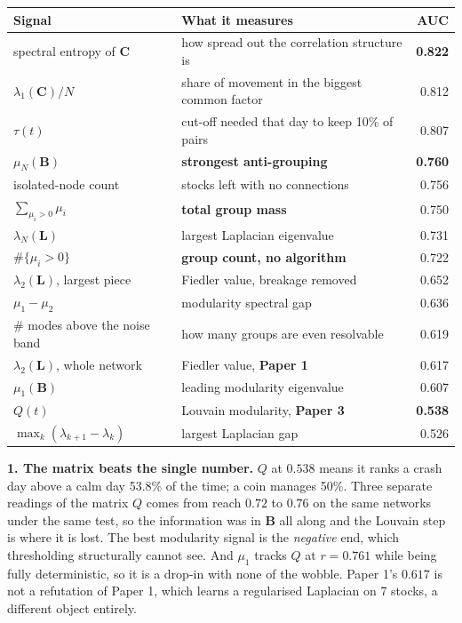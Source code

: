 \documentclass[11pt,a4paper]{article}
\newcommand{\Q}{Q}
\newcommand{\Lap}{\mathbf{L}}
\newcommand{\Bmat}{\mathbf{B}}
\newcommand{\Cmat}{\mathbf{C}}
\begin{document}
\begin{center}\small
\begin{tabular}{@{}llr@{}}
\toprule
\textbf{Signal} & \textbf{What it measures} & \textbf{AUC} \\
\midrule
spectral entropy of $\Cmat$ & how spread out the correlation structure is & \textbf{0.822} \\
$\lambda_1(\Cmat)/N$ & share of movement in the biggest common factor & 0.812 \\
$\tau(t)$ & cut-off needed that day to keep 10\% of pairs & 0.807 \\
$\mu_N(\Bmat)$ & \textbf{strongest anti-grouping} & \textbf{0.760} \\
isolated-node count & stocks left with no connections & 0.756 \\
$\sum_{\mu_i>0}\mu_i$ & \textbf{total group mass} & 0.750 \\
$\lambda_N(\Lap)$ & largest Laplacian eigenvalue & 0.731 \\
$\#\{\mu_i>0\}$ & \textbf{group count, no algorithm} & 0.722 \\
$\lambda_2(\Lap)$, largest piece & Fiedler value, breakage removed & 0.652 \\
$\mu_1-\mu_2$ & modularity spectral gap & 0.636 \\
\# modes above the noise band & how many groups are even resolvable & 0.619 \\
$\lambda_2(\Lap)$, whole network & Fiedler value, \textbf{Paper 1} & 0.617 \\
$\mu_1(\Bmat)$ & leading modularity eigenvalue & 0.607 \\
$\Q(t)$ & Louvain modularity, \textbf{Paper 3} & \textbf{0.538} \\
$\max_k(\lambda_{k+1}-\lambda_k)$ & largest Laplacian gap & 0.526 \\
\bottomrule
\end{tabular}
\end{center}

\textbf{1. The matrix beats the single number.} $\Q$ at $0.538$ means it ranks a
crash day above a calm day 53.8\% of the time; a coin manages 50\%. Three
separate readings of the matrix $\Q$ comes from reach $0.72$ to $0.76$ on the
same networks under the same test, so the information was in $\Bmat$ all along
and the Louvain step is where it is lost. The best modularity signal is the
\emph{negative} end, which thresholding structurally cannot see. And $\mu_1$
tracks $\Q$ at $r = 0.761$ while being fully deterministic, so it is a drop-in
with none of the wobble. Paper 1's $0.617$ is not a refutation of Paper 1, which
learns a regularised Laplacian on 7 stocks, a different object entirely.
\end{document}
